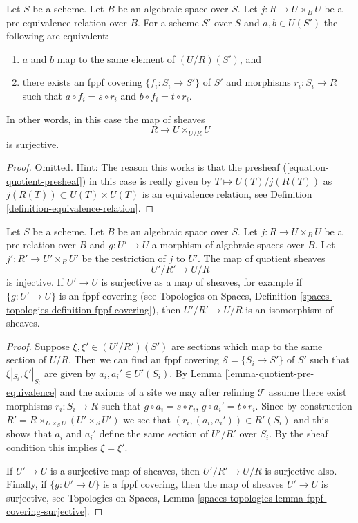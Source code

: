 \begin{lemma}
\label{lemma-quotient-pre-equivalence}
Let $S$ be a scheme. Let $B$ be an algebraic space over $S$.
Let $j : R \to U \times_B U$ be a pre-equivalence relation over $B$.
For a scheme $S'$ over $S$ and $a, b \in U(S')$ the following are equivalent:
\begin{enumerate}
\item $a$ and $b$ map to the same element of $(U/R)(S')$, and
\item there exists an fppf covering $\{f_i : S_i \to S'\}$ of $S'$
and morphisms $r_i : S_i \to R$ such that
$a \circ f_i = s \circ r_i$ and $b \circ f_i = t \circ r_i$.
\end{enumerate}
In other words, in this case the map of sheaves
$$
R \longrightarrow U \times_{U/R} U
$$
is surjective.
\end{lemma}

\begin{proof}
Omitted. Hint: The reason this works is that the presheaf
(\ref{equation-quotient-presheaf}) in this case is really given
by $T \mapsto U(T)/j(R(T))$ as $j(R(T)) \subset U(T) \times U(T)$
is an equivalence relation, see
Definition \ref{definition-equivalence-relation}.
\end{proof}

\begin{lemma}
\label{lemma-quotient-pre-equivalence-relation-restrict}
Let $S$ be a scheme. Let $B$ be an algebraic space over $S$.
Let $j : R \to U \times_B U$ be a pre-relation over $B$
and $g : U' \to U$ a morphism of algebraic spaces over $B$.
Let $j' : R' \to U' \times_B U'$ be the restriction of $j$ to $U'$.
The map of quotient sheaves
$$
U'/R' \longrightarrow U/R
$$
is injective. If $U' \to U$ is surjective as a map of sheaves, for
example if $\{g : U' \to U\}$ is an fppf covering (see
Topologies on Spaces,
Definition \ref{spaces-topologies-definition-fppf-covering}),
then $U'/R' \to U/R$ is an isomorphism of sheaves.
\end{lemma}

\begin{proof}
Suppose $\xi, \xi' \in (U'/R')(S')$ are sections which
map to the same section of $U/R$.
Then we can find an fppf covering $\mathcal{S} = \{S_i \to S'\}$ of $S'$
such that $\xi|_{S_i}, \xi'|_{S_i}$ are given by $a_i, a_i' \in U'(S_i)$. By
Lemma \ref{lemma-quotient-pre-equivalence}
and the axioms of a site we may after refining
$\mathcal{T}$ assume there exist morphisms $r_i : S_i \to R$
such that $g \circ a_i = s \circ r_i$, $g \circ a_i' = t \circ r_i$.
Since by construction
$R' = R \times_{U \times_S U} (U' \times_S U')$
we see that $(r_i, (a_i, a_i')) \in R'(S_i)$ and this
shows that $a_i$ and $a_i'$ define the same section
of $U'/R'$ over $S_i$. By the sheaf condition this implies
$\xi = \xi'$.

\medskip\noindent
If $U' \to U$ is a surjective map of sheaves, then $U'/R' \to U/R$ is
surjective also. Finally, if $\{g : U' \to U\}$ is a fppf covering, then
the map of sheaves $U' \to U$ is surjective, see
Topologies on Spaces,
Lemma \ref{spaces-topologies-lemma-fppf-covering-surjective}.
\end{proof}

